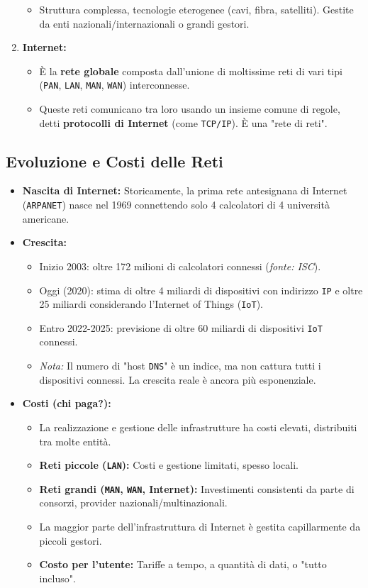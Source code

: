 \begin{enumerate}
\begin{itemize}
        \item Struttura complessa, tecnologie eterogenee (cavi, fibra, satelliti). Gestite da enti nazionali/internazionali o grandi gestori.
    \end{itemize}
    \item \textbf{Internet:}
    \begin{itemize}
        \item È la \textbf{rete globale} composta dall'unione di moltissime reti di vari tipi (\texttt{PAN}, \texttt{LAN}, \texttt{MAN}, \texttt{WAN}) interconnesse.
        \item Queste reti comunicano tra loro usando un insieme comune di regole, detti \textbf{protocolli di Internet} (come \texttt{TCP/IP}). È una "rete di reti".
    \end{itemize}
\end{enumerate}

\subsection{Evoluzione e Costi delle Reti}
\begin{itemize}
    \item \textbf{Nascita di Internet:} Storicamente, la prima rete antesignana di Internet (\texttt{ARPANET}) nasce nel 1969 connettendo solo 4 calcolatori di 4 università americane.
    \item \textbf{Crescita:}
    \begin{itemize}
        \item Inizio 2003: oltre 172 milioni di calcolatori connessi (\textit{fonte: ISC}).
        \item Oggi (2020): stima di oltre 4 miliardi di dispositivi con indirizzo \texttt{IP} e oltre 25 miliardi considerando l'Internet of Things (\texttt{IoT}).
        \item Entro 2022-2025: previsione di oltre 60 miliardi di dispositivi \texttt{IoT} connessi.
        \item \textit{Nota:} Il numero di "host \texttt{DNS}" è un indice, ma non cattura tutti i dispositivi connessi. La crescita reale è ancora più esponenziale.
    \end{itemize}
    \item \textbf{Costi (chi paga?):}
    \begin{itemize}
        \item La realizzazione e gestione delle infrastrutture ha costi elevati, distribuiti tra molte entità.
        \item \textbf{Reti piccole (\texttt{LAN}):} Costi e gestione limitati, spesso locali.
        \item \textbf{Reti grandi (\texttt{MAN}, \texttt{WAN}, Internet):} Investimenti consistenti da parte di consorzi, provider nazionali/multinazionali.
        \item La maggior parte dell'infrastruttura di Internet è gestita capillarmente da piccoli gestori.
        \item \textbf{Costo per l'utente:} Tariffe a tempo, a quantità di dati, o "tutto incluso".
    \end{itemize}
\end{itemize}

